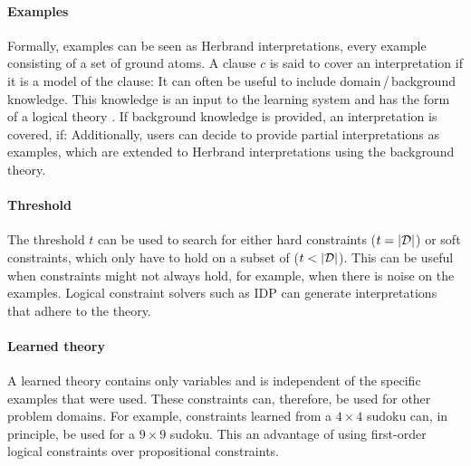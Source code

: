 \paragraph{Examples}
Formally, examples can be seen as Herbrand interpretations, every example consisting of a set of ground atoms.
A clause $c$ is said to cover an interpretation  if it is a model of the clause: 
It can often be useful to include domain\,/\,background knowledge.
This knowledge is an input to the learning system and has the form of a logical theory .
If background knowledge is provided, an interpretation  is covered, if: 
Additionally, users can decide to provide partial interpretations as examples, which are extended to Herbrand interpretations using the background theory.

\paragraph{Threshold}
The threshold $t$ can be used to search for either hard constraints ($t = |\mathcal{D}|$) or soft constraints, which only have to hold on a subset of  ($t < |\mathcal{D}|$).
This can be useful when constraints might not always hold, for example, when there is noise on the examples.
Logical constraint solvers such as IDP can generate interpretations that adhere to the theory.

\paragraph{Learned theory}
A learned theory  contains only variables and is independent of the specific examples that were used.
These constraints can, therefore, be used for other problem domains.
For example, constraints learned from a $4 \times 4$ sudoku can, in principle, be used for a $9 \times 9$ sudoku.
This an advantage of using first-order logical constraints over propositional constraints.



